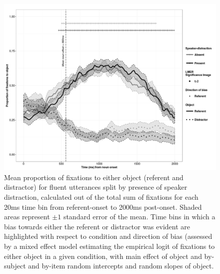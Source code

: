 \documentclass[a4paper,man,natbib]{apa6}
\begin{document}
\begin{figure}[Ht]
  \centering
	\includegraphics[scale=.5]{fluent.png}
  \caption{Mean proportion of fixations to either object (referent and distractor) for fluent utterances split by presence of speaker distraction, calculated out of the total sum of fixations for each 20ms time bin from referent-onset to 2000ms post-onset. Shaded areas represent $\pm 1$ standard error of the mean. Time bins in which a bias towards either the referent or distractor was evident are highlighted with respect to condition and direction of bias (assessed by a mixed effect model estimating the empirical logit of fixations to either object in a given condition, with main effect of object and by-subject and by-item random intercepts and random slopes of object.}
  \label{fig:flueye}
\end{figure}
\end{document}
